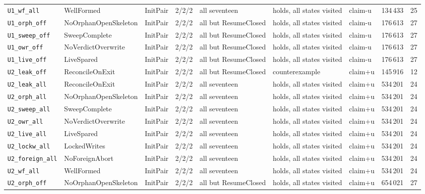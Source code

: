 \documentclass[a4paper,10pt,fleqn]{article}
\begin{document}
{\begin{center}
\begin{tabularx}{\textwidth}{@{}l l l l X X l r r@{}}
\texttt{U1\_wf\_all} & WellFormed & InitPair & 2/2/2 & all seventeen & holds, all states visited & claim-u & 134\,433 & 25 \\
\texttt{U1\_orph\_off} & NoOrphanOpenSkeleton & InitPair & 2/2/2 & all but ResumeClosed & holds, all states visited & claim-u & 176\,613 & 27 \\
\texttt{U1\_sweep\_off} & SweepComplete & InitPair & 2/2/2 & all but ResumeClosed & holds, all states visited & claim-u & 176\,613 & 27 \\
\texttt{U1\_owr\_off} & NoVerdictOverwrite & InitPair & 2/2/2 & all but ResumeClosed & holds, all states visited & claim-u & 176\,613 & 27 \\
\texttt{U1\_live\_off} & LiveSpared & InitPair & 2/2/2 & all but ResumeClosed & holds, all states visited & claim-u & 176\,613 & 27 \\
\texttt{U2\_leak\_off} & ReconcileOnExit & InitPair & 2/2/2 & all but ResumeClosed & counterexample & claim+u & 145\,916 & 12 \\
\texttt{U2\_leak\_all} & ReconcileOnExit & InitPair & 2/2/2 & all seventeen & holds, all states visited & claim+u & 534\,201 & 24 \\
\texttt{U2\_orph\_all} & NoOrphanOpenSkeleton & InitPair & 2/2/2 & all seventeen & holds, all states visited & claim+u & 534\,201 & 24 \\
\texttt{U2\_sweep\_all} & SweepComplete & InitPair & 2/2/2 & all seventeen & holds, all states visited & claim+u & 534\,201 & 24 \\
\texttt{U2\_owr\_all} & NoVerdictOverwrite & InitPair & 2/2/2 & all seventeen & holds, all states visited & claim+u & 534\,201 & 24 \\
\texttt{U2\_live\_all} & LiveSpared & InitPair & 2/2/2 & all seventeen & holds, all states visited & claim+u & 534\,201 & 24 \\
\texttt{U2\_lockw\_all} & LockedWrites & InitPair & 2/2/2 & all seventeen & holds, all states visited & claim+u & 534\,201 & 24 \\
\texttt{U2\_foreign\_all} & NoForeignAbort & InitPair & 2/2/2 & all seventeen & holds, all states visited & claim+u & 534\,201 & 24 \\
\texttt{U2\_wf\_all} & WellFormed & InitPair & 2/2/2 & all seventeen & holds, all states visited & claim+u & 534\,201 & 24 \\
\texttt{U2\_orph\_off} & NoOrphanOpenSkeleton & InitPair & 2/2/2 & all but ResumeClosed & holds, all states visited & claim+u & 654\,021 & 27 \\

\end{tabularx}
\end{center}}
\end{document}
